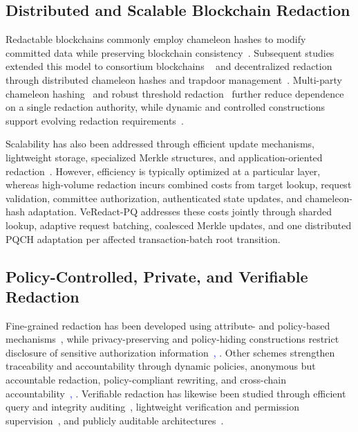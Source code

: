 \documentclass[lettersize,journal]{IEEEtran}
\begin{document}
\subsection{Distributed and Scalable Blockchain Redaction}

Redactable blockchains commonly employ chameleon hashes to modify
committed data while preserving blockchain consistency~\cite{ref9}.
Subsequent studies extended this model to consortium blockchains
~\cite{ref2} and decentralized redaction through distributed chameleon
hashes and trapdoor management~\cite{ref1,ref3,ref6,ref19,ref30}.
Multi-party chameleon hashing~\cite{ref12} and robust threshold
redaction~\cite{ref27} further reduce dependence on a single redaction
authority, while dynamic and controlled constructions support evolving
redaction requirements~\cite{ref5,ref16,ref36}.

Scalability has also been addressed through efficient update
mechanisms, lightweight storage, specialized Merkle structures, and
application-oriented redaction~\cite{ref14,ref20,ref21,ref23,ref26}.
However, efficiency is typically optimized at a particular layer,
whereas high-volume redaction incurs combined costs from target lookup,
request validation, committee authorization, authenticated state
updates, and chameleon-hash adaptation. VeRedact-PQ addresses these
costs jointly through sharded lookup, adaptive request batching,
coalesced Merkle updates, and one distributed PQCH adaptation per
affected transaction-batch root transition.

\subsection{Policy-Controlled, Private, and Verifiable Redaction}

Fine-grained redaction has been developed using attribute- and
policy-based mechanisms~\cite{ref8,ref15}, while privacy-preserving and
policy-hiding constructions restrict disclosure of sensitive
authorization information~\cite{ref4,ref18,ref31,ref34}\textcolor{blue}{, \cite{ref24}}. Other schemes
strengthen traceability and accountability through dynamic policies,
anonymous but accountable redaction, policy-compliant rewriting, and
cross-chain accountability~\cite{ref28,ref29,ref32,ref35}\textcolor{blue}{, \cite{ref25}}. Verifiable
redaction has likewise been studied through efficient query and
integrity auditing~\cite{ref13}, lightweight verification and
permission supervision~\cite{ref20}, and publicly auditable
architectures~\cite{ref33}.
\end{document}
